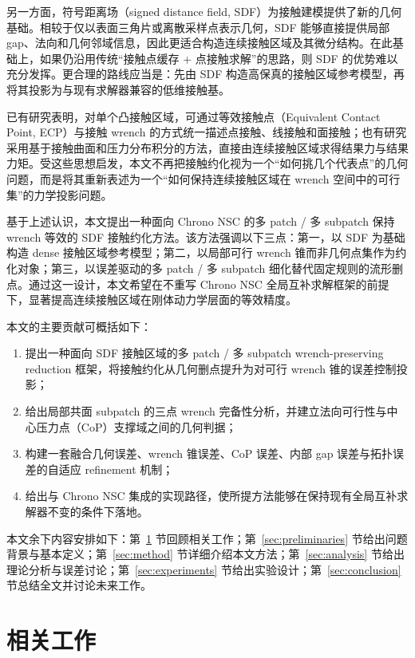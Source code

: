 \documentclass[UTF8,a4paper,11pt]{ctexart}
\begin{document}
另一方面，符号距离场（signed distance field, SDF）为接触建模提供了新的几何基础。相较于仅以表面三角片或离散采样点表示几何，SDF 能够直接提供局部 gap、法向和几何邻域信息，因此更适合构造连续接触区域及其微分结构。在此基础上，如果仍沿用传统“接触点缓存 + 点接触求解”的思路，则 SDF 的优势难以充分发挥。更合理的路线应当是：先由 SDF 构造高保真的接触区域参考模型，再将其投影为与现有求解器兼容的低维接触基。

已有研究表明，对单个凸接触区域，可通过等效接触点（Equivalent Contact Point, ECP）与接触 wrench 的方式统一描述点接触、线接触和面接触；也有研究采用基于接触曲面和压力分布积分的方法，直接由连续接触区域求得结果力与结果力矩。受这些思想启发，本文不再把接触约化视为一个“如何挑几个代表点”的几何问题，而是将其重新表述为一个“如何保持连续接触区域在 wrench 空间中的可行集”的力学投影问题。

基于上述认识，本文提出一种面向 Chrono NSC 的多 patch / 多 subpatch 保持 wrench 等效的 SDF 接触约化方法。该方法强调以下三点：第一，以 SDF 为基础构造 dense 接触区域参考模型；第二，以局部可行 wrench 锥而非几何点集作为约化对象；第三，以误差驱动的多 patch / 多 subpatch 细化替代固定规则的流形删点。通过这一设计，本文希望在不重写 Chrono NSC 全局互补求解框架的前提下，显著提高连续接触区域在刚体动力学层面的等效精度。

本文的主要贡献可概括如下：
\begin{enumerate}[label=(\arabic*)]
    \item 提出一种面向 SDF 接触区域的多 patch / 多 subpatch wrench-preserving reduction 框架，将接触约化从几何删点提升为对可行 wrench 锥的误差控制投影；
    \item 给出局部共面 subpatch 的三点 wrench 完备性分析，并建立法向可行性与中心压力点（CoP）支撑域之间的几何判据；
    \item 构建一套融合几何误差、wrench 锥误差、CoP 误差、内部 gap 误差与拓扑误差的自适应 refinement 机制；
    \item 给出与 Chrono NSC 集成的实现路径，使所提方法能够在保持现有全局互补求解器不变的条件下落地。
\end{enumerate}

本文余下内容安排如下：第~\ref{sec:related} 节回顾相关工作；第~\ref{sec:preliminaries} 节给出问题背景与基本定义；第~\ref{sec:method} 节详细介绍本文方法；第~\ref{sec:analysis} 节给出理论分析与误差讨论；第~\ref{sec:experiments} 节给出实验设计；第~\ref{sec:conclusion} 节总结全文并讨论未来工作。

\section{相关工作}
\label{sec:related}
\end{document}

